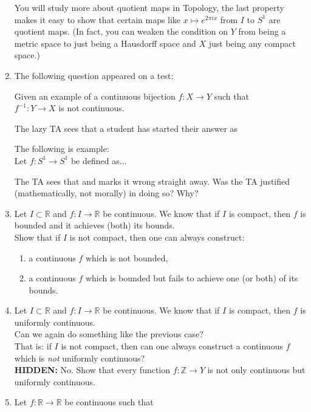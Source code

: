 \documentclass[12pt]{article}
\theoremstyle{definition}
\numberwithin{thm}{section}
\newcommand{\hint}[1]{\textbf{HIDDEN:} {\color[rgb]{0.95, 0.95, 0.95}#1}}
\newenvironment{blockquote}
{\begin{mdframed}[skipabove=0pt, skipbelow=0pt, innertopmargin=4pt, innerbottommargin=4pt, bottomline=false,topline=false,rightline=false, linewidth=2pt]}
{\end{mdframed}}
\begin{document}
\begin{enumerate}
\begin{enumerate}
	\end{enumerate}
	You will study more about quotient maps in Topology, the last property makes it easy to show that certain maps like $x \mapsto e^{2\pi ix}$ from $I$ to $S^1$ are quotient maps. (In fact, you can weaken the condition on $Y$ from being a metric space to just being a Hausdorff space and $X$ just being any compact space.)
	\item The following question appeared on a test:\\
	\begin{blockquote}
		Given an example of a continuous bijection $f:X \to Y$ such that \\
		$f^{-1}:Y \to X$ is not continuous. 
	\end{blockquote}
	The lazy TA sees that a student has started their answer as\\
	\begin{blockquote}
		The following is example:\\
		Let $f:S^1 \to S^1$ be defined as...
	\end{blockquote}
	The TA sees that and marks it wrong straight away. Was the TA justified (mathematically, not morally) in doing so? Why?
	\item Let $I \subset \mathbb{R}$ and $f:I \to \mathbb{R}$ be continuous. We know that if $I$ is compact, then $f$ is bounded and it achieves (both) its bounds.\\
	Show that if $I$ is not compact, then one can always construct:
	\begin{enumerate}
		\item a continuous $f$ which is not bounded,
		\item a continuous $f$ which is bounded but fails to achieve one (or both) of its bounds.
	\end{enumerate}
	\item Let $I \subset \mathbb{R}$ and $f:I \to \mathbb{R}$ be continuous. We know that if $I$ is compact, then $f$ is uniformly continuous.\\
	Can we again do something like the previous case?\\
	That is: if $I$ is not compact, then can one always construct a continuous $f$ which is \emph{not} uniformly continuous?\\
	\hint{No. Show that every function $f:\mathbb{Z} \to Y$ is not only continuous but uniformly continuous.}
	\item Let $f:\mathbb{R} \to \mathbb{R}$ be continuous such that
	\begin{equation*} 

\end{equation*}
\end{enumerate}
\end{document}
